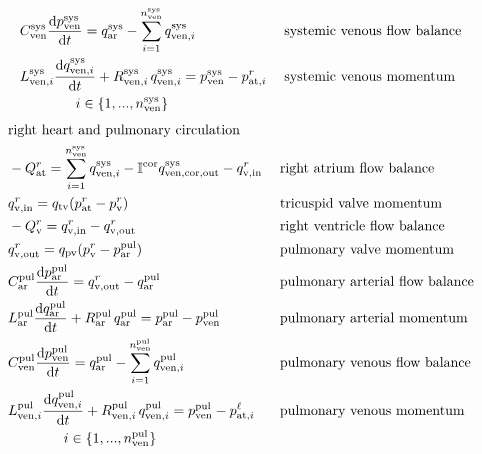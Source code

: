 \documentclass[a4paper,12pt]{report}
\begin{document}
\begin{alignat}{2}
&C_{\mathrm{ven}}^{\mathrm{sys}} \frac{\mathrm{d}p_{\mathrm{ven}}^{\mathrm{sys}}}{\mathrm{d}t} = q_{\mathrm{ar}}^{\mathrm{sys}}-\sum\limits_{i=1}^{n_{\mathrm{ven}}^{\mathrm{sys}}}q_{\mathrm{ven},i}^{\mathrm{sys}}\ && \text{\;systemic venous flow balance}\nonumber\\
&L_{\mathrm{ven},i}^{\mathrm{sys}} \frac{\mathrm{d}q_{\mathrm{ven},i}^{\mathrm{sys}}}{\mathrm{d}t} + R_{\mathrm{ven},i}^{\mathrm{sys}}\, q_{\mathrm{ven},i}^{\mathrm{sys}} = p_{\mathrm{ven}}^{\mathrm{sys}} - p_{\mathrm{at},i}^{r} && \text{\;systemic venous momentum}\nonumber\\
&\qquad\qquad i \in \{1,...,n_{\mathrm{ven}}^{\mathrm{sys}}\} && \nonumber
\end{alignat}
\begin{alignat}{2}
&\text{right heart and pulmonary circulation} && \nonumber\\
&-Q_{\mathrm{at}}^{r} = \sum\limits_{i=1}^{n_{\mathrm{ven}}^{\mathrm{sys}}}q_{\mathrm{ven},i}^{\mathrm{sys}} - \mathbb{I}^{\mathrm{cor}} q_{\mathrm{ven,cor,out}}^{\mathrm{sys}} - q_{\mathrm{v,in}}^{r} && \text{\;right atrium flow balance}\nonumber\\
&q_{\mathrm{v,in}}^{r} = q_{\mathrm{tv}}(p_{\mathrm{at}}^{r}-p_{\mathrm{v}}^{r}) && \text{\;tricuspid valve momentum}\label{eq:tv_flow}\\
&-Q_{\mathrm{v}}^{r} = q_{\mathrm{v,in}}^{r} - q_{\mathrm{v,out}}^{r} && \text{\;right ventricle flow balance}\nonumber\\
&q_{\mathrm{v,out}}^{r} = q_{\mathrm{pv}}(p_{\mathrm{v}}^{r}-p_{\mathrm{ar}}^{\mathrm{pul}}) && \text{\;pulmonary valve momentum}\label{eq:pv_flow}\\
&C_{\mathrm{ar}}^{\mathrm{pul}} \frac{\mathrm{d}p_{\mathrm{ar}}^{\mathrm{pul}}}{\mathrm{d}t} = q_{\mathrm{v,out}}^{r} - q_{\mathrm{ar}}^{\mathrm{pul}} && \text{\;pulmonary arterial flow balance}\nonumber\\
&L_{\mathrm{ar}}^{\mathrm{pul}} \frac{\mathrm{d}q_{\mathrm{ar}}^{\mathrm{pul}}}{\mathrm{d}t} + R_{\mathrm{ar}}^{\mathrm{pul}}\,q_{\mathrm{ar}}^{\mathrm{pul}}=p_{\mathrm{ar}}^{\mathrm{pul}} -p_{\mathrm{ven}}^{\mathrm{pul}} && \text{\;pulmonary arterial momentum}\nonumber\\
&C_{\mathrm{ven}}^{\mathrm{pul}} \frac{\mathrm{d}p_{\mathrm{ven}}^{\mathrm{pul}}}{\mathrm{d}t} = q_{\mathrm{ar}}^{\mathrm{pul}} - \sum\limits_{i=1}^{n_{\mathrm{ven}}^{\mathrm{pul}}}q_{\mathrm{ven},i}^{\mathrm{pul}} && \text{\;pulmonary venous flow balance}\nonumber\\
&L_{\mathrm{ven},i}^{\mathrm{pul}} \frac{\mathrm{d}q_{\mathrm{ven},i}^{\mathrm{pul}}}{\mathrm{d}t} + R_{\mathrm{ven},i}^{\mathrm{pul}}\, q_{\mathrm{ven},i}^{\mathrm{pul}}=p_{\mathrm{ven}}^{\mathrm{pul}}-p_{\mathrm{at},i}^{\ell} && \text{\;pulmonary venous momentum}\nonumber\\
&\qquad\qquad i \in \{1,...,n_{\mathrm{ven}}^{\mathrm{pul}}\} && \nonumber
\end{alignat}
\end{document}
